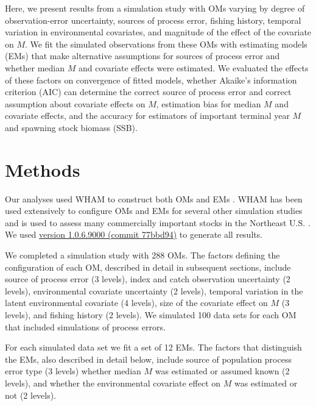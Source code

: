 \documentclass[
  12pt,
]{article}
\begin{document}
Here, we present results from a simulation study with OMs varying by degree of observation-error uncertainty, sources of process error, fishing history, temporal variation in environmental covariates, and magnitude of the effect of the covariate on \(M\). We fit the simulated observations from these OMs with estimating models (EMs) that make alternative assumptions for sources of process error and whether median \(M\) and covariate effects were estimated. We evaluated the effects of these factors on convergence of fitted models, whether Akaike's information criterion (AIC) can determine the correct source of process error and correct assumption about covariate effects on \(M\), estimation bias for median \(M\) and covariate effects, and the accuracy for estimators of important terminal year \(M\) and spawning stock biomass (SSB).

\section*{Methods}\label{methods}

Our analyses used WHAM to construct both OMs and EMs \citep{millerstock20, stockmiller21, milleretal25}. WHAM has been used extensively to configure OMs and EMs for several other simulation studies \citep{stocketal21, legaultetal23, lietal24, brittenetal26, lietal26_a} and is used to assess many commercially important stocks in the Northeast U.S. \citep[e.g.,][]{nefsc22, nefsc22a, nefsc24}. We used \href{https://github.com/timjmiller/wham/tree/77bbd946e4881216a439933473d1c58b21c270c3}{version 1.0.6.9000 (commit 77bbd94)} to generate all results.

We completed a simulation study with 288 OMs. The factors defining the configuration of each OM, described in detail in subsequent sections, include source of process error (3 levels), index and catch observation uncertainty (2 levels), environmental covariate uncertainty (2 levels), temporal variation in the latent environmental covariate (4 levels), size of the covariate effect on \(M\) (3 levels), and fishing history (2 levels). We simulated 100 data sets for each OM that included simulations of process errors.

For each simulated data set we fit a set of 12 EMs. The factors that distinguish the EMs, also described in detail below, include source of population process error type (3 levels) whether median \(M\) was estimated or assumed known (2 levels), and whether the environmental covariate effect on \(M\) was estimated or not (2 levels).
\end{document}
